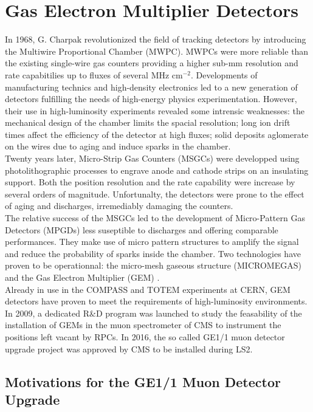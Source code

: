 \chapter{Gas Electron Multiplier Detectors}
\label{chap:II-1-gem}

  In 1968, G. Charpak revolutionized the field of tracking detectors by introducing the Multiwire Proportional Chamber (MWPC). MWPCs were more reliable than the existing single-wire gas counters providing a higher sub-mm resolution and rate capabitilies up to fluxes of several MHz cm$^{-2}$. Developments of manufacturing technics and high-density electronics led to a new generation of detectors fulfilling the needs of high-energy physics experimentation. However, their use in high-luminosity experiments revealed some intrensic weaknesses: the mechanical design of the chamber limits the spacial resolution; long ion drift times affect the efficiency of the detector at high fluxes; solid deposits aglomerate on the wires due to aging and induce sparks in the chamber. \\

  Twenty years later, Micro-Strip Gas Counters (MSGCs) were developped using photolithographic processes to engrave anode and cathode strips on an insulating support. Both the position resolution and the rate capability were increase by several orders of magnitude. Unfortunalty, the detectors were prone to the effect of aging and discharges, irremediably damaging the counters. \\

  The relative success of the MSGCs led to the development of Micro-Pattern Gas Detectors (MPGDs) less suseptible to discharges and offering comparable performances. They make use of micro pattern structures to amplify the signal and reduce the probability of sparks inside the chamber. Two technologies have proven to be operationnal: the micro-mesh gaseous structure (MICROMEGAS) and the Gas Electron Multiplier (GEM) \cite{SAULI1997531}. \\

  Already in use in the COMPASS and TOTEM experiments at CERN, GEM detectors have proven to meet the requirements of high-luminosity environments. In 2009, a dedicated R\&D program was launched to study the feasability of the installation of GEMs in the muon spectrometer of CMS to instrument the positions left vacant by RPCs. In 2016, the so called GE1/1 muon detector upgrade project was approved by CMS to be installed during LS2.

  \section{Motivations for the GE1/1 Muon Detector Upgrade}

